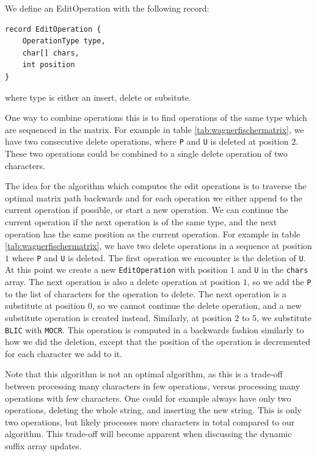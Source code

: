 We define an EditOperation with the following record:

\begin{lstlisting}
record EditOperation {
    OperationType type,
    char[] chars,
    int position
}
\end{lstlisting}

where type is either an insert, delete or subsitute.

One way to combine operations this is to find operations of the same type which are
sequenced in the matrix. For example in table \ref{tab:wagnerfischermatrix}, we have two
consecutive delete operations, where \verb|P| and \verb|U| is deleted at position $2$.
These two operations could be combined to a single delete operation of two characters.

The idea for the algorithm which computes the edit operations is to traverse the optimal
matrix path backwards and for each operation we either append to the current operation if
possible, or start a new operation. We can continue the current operation if the next
operation is of the same type, and the next operation has the same position as the current
operation. For example in table \ref{tab:wagnerfischermatrix}, we have two delete
operations in a sequence at position $1$ where \verb|P| and \verb|U| is deleted. The first
operation we encounter is the deletion of \verb|U|. At this point we create a new
\verb|EditOperation| with position $1$ and \verb|U| in the \verb|chars| array. The next
operation is also a delete operation at position $1$, so we add the \verb|P| to the list
of characters for the operation to delete. The next operation is a substitute at position
$0$, so we cannot continue the delete operation, and a new substitute operation is created
instead. Similarly, at position $2$ to $5$, we substitute \verb|BLIC| with \verb|MOCR|.
This operation is computed in a backwards fashion similarly to how we did the deletion,
except that the position of the operation is decremented for each character we add to it.

Note that this algorithm is not an optimal algorithm, as this is a trade-off between
processing many characters in few operations, versus processing many operations with few
characters. One could for example always have only two operations, deleting the whole
string, and inserting the new string. This is only two operations, but likely processes
more characters in total compared to our algorithm. This trade-off will become apparent
when discussing the dynamic suffix array updates.

